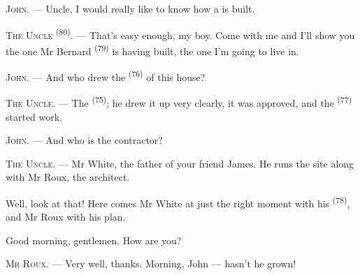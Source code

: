 %
%

\VUsaut{6.0mm}
\VUsaut{1.4mm}
\VUsaut{2.2mm}

\VUsaut{3.0mm}

\textsc{John}. --- Uncle, I would really like to know how a
 is built.

\textsc{The Uncle} \textsuperscript{(80)}. --- That's easy enough, my boy. Come with me and
I'll show you the one Mr Bernard \textsuperscript{(79)} is having built, the one I'm going to
live in.

\textsc{John}. --- And who drew the  \textsuperscript{(76)} of this house?

\textsc{The Uncle}. --- The  \textsuperscript{(75)}; he drew it up very
clearly, it was approved, and the  \textsuperscript{(77)} started
work.

\textsc{John}. --- And who is the contractor?

\textsc{The Uncle}. --- Mr White, the father of your friend James. He runs the site along with
Mr Roux, the architect.

Well, look at that! Here comes Mr White at just the right moment with his
 \textsuperscript{(78)}, and Mr Roux with his plan.

Good morning, gentlemen. How are you?

\textsc{Mr Roux}. --- Very well, thanks. Morning, John --- hasn't he grown!

